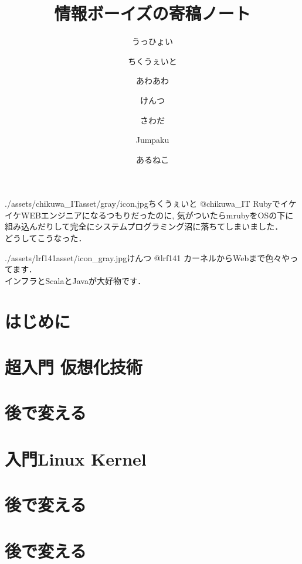 \documentclass[autodetect-engine,dvipdfmx-if-dvi,ja=standard,b5paper,10.5pt,twoside,openany,layout=v2]{bxjsbook}
\title{情報ボーイズの寄稿ノート}
\author{うっひょい \and ちくうぇいと \and あわあわ \and けんつ \and さわだ \and Jumpaku \and あるねこ}
\date{}
\newcommand{\articlepath}{./articles}
\newcommand{\assetspath}{./assets}
\newcommand{\lrfasset}{\assetspath/lrf141asset}
\newcommand{\chikuwaitasset}{\assetspath/chikuwa_ITasset/gray}
\begin{document}
\frontmatter
\maketitle
\begin{myintroduce}{\chikuwaitasset/icon.jpg}{ちくうぇいと @chikuwa\_IT}
  RubyでイケイケWEBエンジニアになるつもりだったのに, 気がついたらmrubyをOSの下に組み込んだりして完全にシステムプログラミング沼に落ちてしまいました．\\
  どうしてこうなった．
\end{myintroduce}
\begin{myintroduce}{\lrfasset/icon_gray.jpg}{けんつ @lrf141}
  カーネルからWebまで色々やってます．\\
  インフラとScalaとJavaが大好物です．
\end{myintroduce}


\chapter{はじめに}
\addtolength{\oddsidemargin}{10pt}
\addtolength{\evensidemargin}{-10pt}


\tableofcontents
\mainmatter

\chapter{超入門 仮想化技術}


\chapter{後で変える}


\chapter{入門Linux Kernel}


\chapter{後で変える}


\chapter{後で変える}

\end{document}
